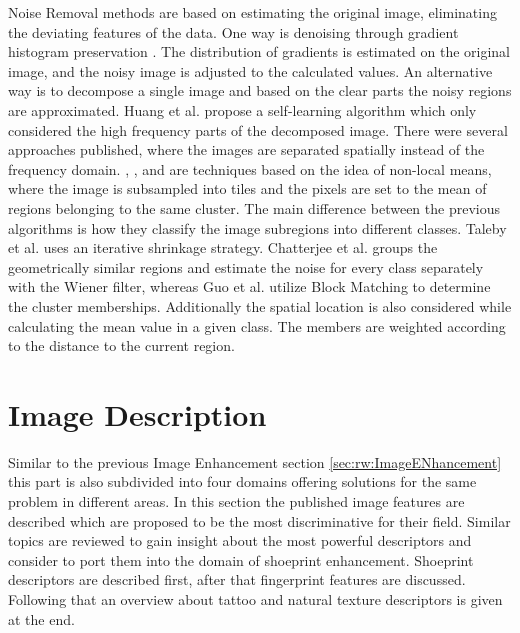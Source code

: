\documentclass[draft,final]{vutinfth} %
\begin{document}
Noise Removal methods are based on estimating the original image, eliminating the deviating features of the data.
One way is denoising through gradient histogram preservation \cite{zuo2013texture}.
The distribution of gradients is estimated on the original image, and the noisy image is adjusted to the calculated values.
An alternative way is to decompose a single image and based on the clear parts the noisy regions are approximated.
Huang et al. \cite{huang2013self} propose a self-learning algorithm which only considered the high frequency parts of the decomposed image.
There were several approaches published, where the images are separated spatially instead of the frequency domain.
\cite{xu2015patch}, \cite{talebi2013global}, \cite{chatterjee2011patch} and \cite{guo2015efficient} are techniques based on the idea of non-local means, where the image is subsampled into tiles and the pixels are set to the mean of regions belonging to the same cluster.
The main difference between the previous algorithms is how they classify the image subregions into different classes.
Taleby et al. \cite{talebi2013global} uses an iterative shrinkage strategy. 
Chatterjee et al.  \cite{chatterjee2011patch} groups the geometrically similar regions and estimate the noise for every class separately with the Wiener filter, whereas Guo et al. \cite{guo2015efficient} utilize Block Matching to determine the cluster memberships. 
Additionally the spatial location is also considered while calculating the mean value in a given class.
The members are weighted according to the distance to the current region.

\section{Image Description}

Similar to the previous Image Enhancement section \ref{sec:rw:ImageENhancement} this part is also subdivided into four domains offering solutions for the same problem in different areas.
In this section the published image features are described which are proposed to be the most discriminative for their field.
Similar topics are reviewed to gain insight about the most powerful descriptors and consider to port them into the domain of shoeprint enhancement.
Shoeprint descriptors are described first, after that fingerprint features are discussed.
Following that an overview about tattoo and natural texture descriptors is given at the end.
\end{document}
